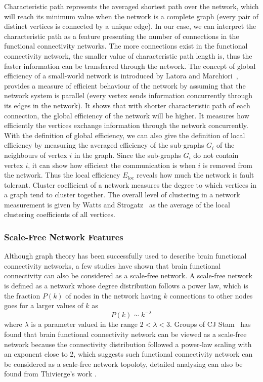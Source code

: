 \documentclass[conference]{IEEEtran}
\begin{document}
Characteristic path represents the averaged shortest path over the network, which will reach its minimum value when the network is a complete graph (every pair of distinct vertices is connected by a unique edge). In our case, we can interpret the characteristic path as a feature presenting the number of connections in the functional connectivity networks. The more connections exist in the functional connectivity network, the smaller value of characteristic path length is, thus the faster information can be transferred through the network. The concept of global efficiency of a small-world network is introduced by Latora and Marchiori~\cite{latora2001efficient}, provides a measure of efficient behaviour of the network by assuming that the network system is parallel (every vertex sends information concurrently through its edges in the network). It shows that with shorter characteristic path of each connection, the global efficiency of the network will be higher. It measures how efficiently the vertices exchange information through the network concurrently. With the definition of global efficiency, we can also give the definition of local efficiency by measuring the averaged efficiency of the sub-graphs \textbf{$G_i$} of the neighbours of vertex $i$ in the graph. Since the sub-graphs \textbf{$G_i$} do not contain vertex $i$, it can show how efficient the communication is when $i$ is removed from the network. Thus the local efficiency $E_{loc}$ reveals how much the network is fault tolerant. Cluster coefficient of a network measures the degree to which vertices in a graph tend to cluster together. The overall level of clustering in a network measurement is given by Watts and Strogatz~\cite{watts1998collective} as the average of the local clustering coefficients of all vertices. 

\subsubsection{Scale-Free Network Features}
Although graph theory has been successfully used to describe brain functional connectivity networks, a few studies have shown that brain functional connectivity can also be considered as a scale-free network. A scale-free network is defined as a network whose degree distribution follows a power law, which is the fraction $P(k)$ of nodes in the network having $k$ connections to other nodes goes for a larger values of $k$ as
\begin{equation}
P(k) \sim k^{-\lambda}
\end{equation}
where $\lambda$ is a parameter valued in the range $2<\lambda<3$.
Groups of CJ Stam~\cite{stam2004functional} has found that brain functional connectivity network can be viewed as a scale-free network because the connectivity distribution followed a power-law scaling with an exponent close to 2, which suggests such functional connectivity network can be considered as a scale-free network topoloty\cite{van2008small}, detailed analysing can also be found from Thivierge's work \cite{thivierge2014scale}.
\end{document}
